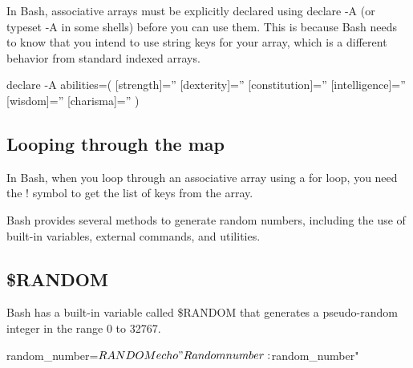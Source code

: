 \documentclass{report}
\begin{document}
    \pagebreak 
    \bigbreak \noindent 
    In Bash, associative arrays must be explicitly declared using declare -A (or typeset -A in some shells) before you can use them. This is because Bash needs to know that you intend to use string keys for your array, which is a different behavior from standard indexed arrays.
    \bigbreak \noindent 
    \bigbreak \noindent 
    \begin{bashcode}
    declare -A abilities=(
        [strength]=''
        [dexterity]=''
        [constitution]=''
        [intelligence]=''
        [wisdom]=''
        [charisma]=''
  )
    \end{bashcode}

    \bigbreak \noindent 
    \subsection{Looping through the map}
    \bigbreak \noindent 
    In Bash, when you loop through an associative array using a for loop, you need the ! symbol to get the list of keys from the array.
    \bigbreak \noindent 
    \bigbreak \noindent 


    \pagebreak 
    \bigbreak \noindent 
    Bash provides several methods to generate random numbers, including the use of built-in variables, external commands, and utilities.
    \bigbreak \noindent 
    \subsection{\$RANDOM}
    \bigbreak \noindent 
    Bash has a built-in variable called \$RANDOM that generates a pseudo-random integer in the range 0 to 32767.
    \bigbreak \noindent 
    \begin{bashcode}
    random_number=$RANDOM
    echo "Random number: $random_number"
    \end{bashcode}
    \bigbreak \noindent 
\end{document}
